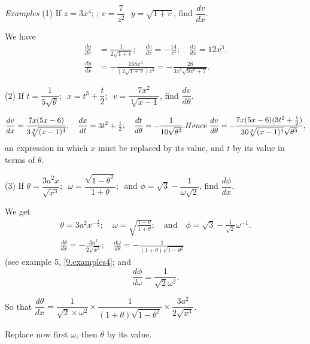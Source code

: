 \documentclass{ximera}
\begin{document}
\textit{Examples}
(1) If $z = 3x^4$;\,\,; $v = \dfrac{7}{z^2}$\,\, $y =\sqrt{1+v}$, find $\dfrac{dv}{dx}$.

We have
\begin{align*}
\frac{dy}{dv} &= \frac{1}{2\sqrt{1+v}};\quad
\frac{dv}{dz} = -\frac{14}{z^3};\quad
\frac{dz}{dx} = 12x^3. \\
\frac{dy}{dx} &= -\frac{168x^3}{(2\sqrt{1+v})z^3}
               = -\frac{28}{3x^5\sqrt{9x^8+7}}.
\end{align*}

(2) If $t = \dfrac{1}{5\sqrt{\theta}}$;\,\, $x = t^3 + \dfrac{t}{2}$;\,\, $v = \dfrac{7x^2}{\sqrt[3]{x-1}}$, find $\dfrac{dv}{d\theta}$.

\[
\frac{dv}{dx} = \frac{7x(5x-6)}{3\sqrt[3]{(x-1)^4}};\quad
\frac{dx}{dt} = 3t^2 + \tfrac{1}{2};\quad
\frac{dt}{d\theta} = -\frac{1}{10\sqrt{\theta^3}}. \\
 Hence \;
\frac{dv}{d\theta}
  = -\frac{7x(5x-6)(3t^2+\frac{1}{2})}
          {30\sqrt[3]{(x-1)^4} \sqrt{\theta^3}},
\]
an expression in which $x$ must be replaced by its
value, and $t$ by its value in terms of $\theta$.

(3) If $\theta = \dfrac{3a^2x}{\sqrt{x^3}}$;\,\, $\omega = \dfrac{\sqrt{1-\theta^2}}{1+\theta}$;\,\, and $\phi = \sqrt{3} - \dfrac{1}{\omega\sqrt{2}}$,
find $\dfrac{d\phi}{dx}$.


We get
\begin{gather*}
\theta = 3a^2x^{-\frac{1}{2}};\quad
\omega = \sqrt{\frac{1-\theta}{1+\theta}};\quad \text{and}\quad
\phi = \sqrt{3} - \frac{1}{\sqrt{2}} \omega^{-1}. \\
\frac{d\theta}{dx} = -\frac{3a^2}{2\sqrt{x^3}};\quad
\frac{d\omega}{d\theta} = -\frac{1}{(1+\theta)\sqrt{1-\theta^2}}
\end{gather*}
(see example 5, \ref{9.examples4}; and
\[
\frac{d\phi}{d\omega} = \frac{1}{\sqrt{2}\omega^2}.
\]

So that $\dfrac{d\theta}{dx} = \dfrac{1}{\sqrt{2} \times \omega^2}
  \times \dfrac{1}{(1+\theta) \sqrt{1-\theta^2}}
  \times \dfrac{3a^2}{2\sqrt{x^3}}$.

Replace now first $\omega$, then $\theta$ by its value.
\end{document}
